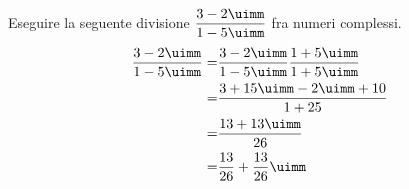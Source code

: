 Eseguire la seguente divisione  $\dfrac{3-2\uimm}{1-5\uimm}$ fra numeri complessi.
\begin{align*}
\dfrac{3-2\uimm}{1-5\uimm}=&\dfrac{3-2\uimm}{1-5\uimm}\dfrac{1+5\uimm}{1+5\uimm}\\
=&\dfrac{3+15\uimm-2\uimm+10}{1+25}\\
=&\dfrac{13+13\uimm}{26}\\
=&\dfrac{13}{26}+\dfrac{13}{26}\uimm\\
\end{align*}
 
